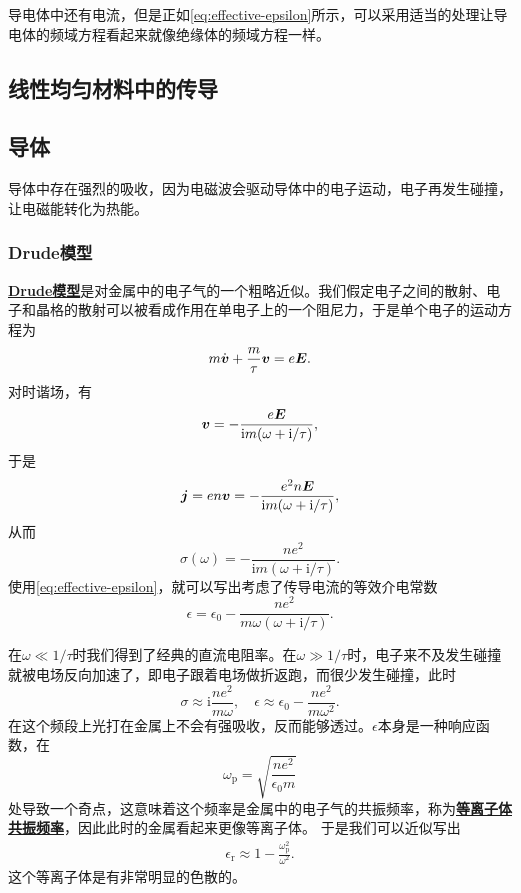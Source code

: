 \documentclass[UTF8, a4paper]{ctexart}
\newcommand*{\ii}{\mathrm{i}}
\newcommand*{\concept}[1]{\underline{\textbf{#1}}}
\begin{document}
导电体中还有电流，但是正如\eqref{eq:effective-epsilon}所示，可以采用适当的处理让导电体的频域方程看起来就像绝缘体的频域方程一样。

\subsection{线性均匀材料中的传导}



\subsection{导体}

导体中存在强烈的吸收，因为电磁波会驱动导体中的电子运动，电子再发生碰撞，让电磁能转化为热能。

\subsubsection{Drude模型}

\concept{Drude模型}是对金属中的电子气的一个粗略近似。我们假定电子之间的散射、电子和晶格的散射可以被看成作用在单电子上的一个阻尼力，于是单个电子的运动方程为 %
\begin{equation}
    m \dot{\vb*{v}} + \frac{m}{\tau} \vb*{v} = e \vb*{E}.
\end{equation}
对时谐场，有
\begin{equation}
    \vb*{v} = - \frac{e \vb*{E}}{\ii m (\omega + \ii / \tau)},
\end{equation}
于是
\[
    \vb*{j} = e n \vb*{v} = - \frac{e^2 n \vb*{E}}{\ii m (\omega + \ii / \tau)},
\]
从而
\begin{equation}
    \sigma(\omega) = - \frac{n e^2}{\ii m (\omega + \ii / \tau)}.
\end{equation}
使用\eqref{eq:effective-epsilon}，就可以写出考虑了传导电流的等效介电常数
\begin{equation}
    \epsilon = \epsilon_0 - \frac{n e^2}{m \omega (\omega + \ii / \tau)}.
\end{equation}

在$\omega \ll 1/\tau$时我们得到了经典的直流电阻率。在$\omega \gg 1/\tau$时，电子来不及发生碰撞就被电场反向加速了，即电子跟着电场做折返跑，而很少发生碰撞，此时
\begin{equation}
    \sigma \approx \ii \frac{ne^2}{m \omega}, \quad \epsilon \approx \epsilon_0 - \frac{n e^2}{m \omega^2}.
\end{equation}
在这个频段上光打在金属上不会有强吸收，反而能够透过。$\epsilon$本身是一种响应函数，在
\begin{equation}
    \omega_\text{p} = \sqrt{\frac{ne^2}{\epsilon_0 m}}
\end{equation}
处导致一个奇点，这意味着这个频率是金属中的电子气的共振频率，称为\concept{等离子体共振频率}，因此此时的金属看起来更像等离子体。
于是我们可以近似写出
\begin{eqnarray}
    \epsilon_\text{r} \approx 1 - \frac{\omega_\text{p}^2}{\omega^2}.
\end{eqnarray}
这个等离子体是有非常明显的色散的。
\end{document}
